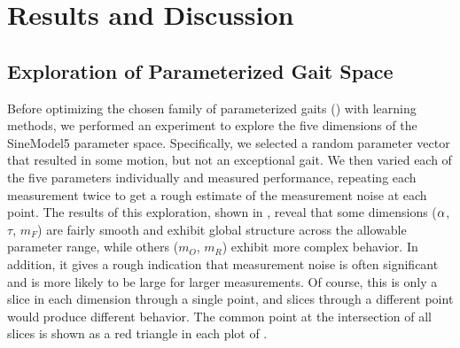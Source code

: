 \section{Results and Discussion}




\subsection{Exploration of Parameterized Gait Space}


Before optimizing the chosen family of parameterized gaits
() with learning methods, we performed an
experiment to explore the five dimensions of the SineModel5 parameter
space. Specifically, we selected a random parameter vector that
resulted in some motion, but not an exceptional gait. We then varied
each of the five parameters individually and measured performance,
repeating each measurement twice to get a rough estimate of the
measurement noise at each point.  The results of this exploration,
shown in , reveal that some dimensions ($\alpha$,
$\tau$, $m_F$) are fairly smooth and exhibit global structure across
the allowable parameter range, while others ($m_O$, $m_R$) exhibit
more complex behavior.  In addition, it gives a rough indication that
measurement noise is often significant and is more likely to be large
for larger measurements.  Of course, this is only a slice in each
dimension through a single point, and slices through a different point
would produce different behavior.  The common point at the
intersection of all slices is shown as a red triangle in
each plot of .



